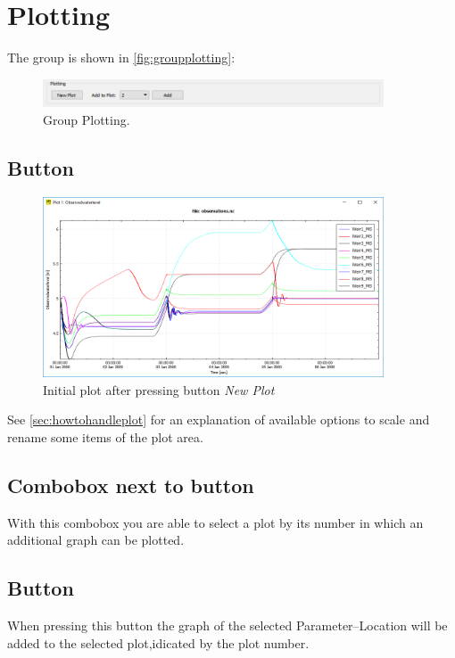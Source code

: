 \documentclass{deltares_memo}
\begin{document}
\section{Plotting}
The group  is shown in \autoref{fig:groupplotting}:
\begin{figure}[H]
    \centering    
    \includegraphics[width=0.9\textwidth]{pictures/group_plotting.png}
    \caption{Group Plotting. \label{fig:groupplotting}}
\end{figure}

\subsection{Button }
\phantom{m}\vspace{-\baselineskip}
\begin{figure}[H]
    \centering    
    \includegraphics[width=0.9\textwidth]{pictures/plot.png}
    \caption{Initial plot after pressing button \emph{New Plot}}
\end{figure}
See \autoref{sec:howtohandleplot} for an explanation of available options to scale and rename some items of the plot area.
\subsection{Combobox next to button }
With this combobox you are able to select a plot by its number in which an additional graph can be plotted.

\subsection{Button }
When pressing this button the graph of the selected Parameter--Location will be added to the selected plot,idicated by the plot number.
\end{document}
